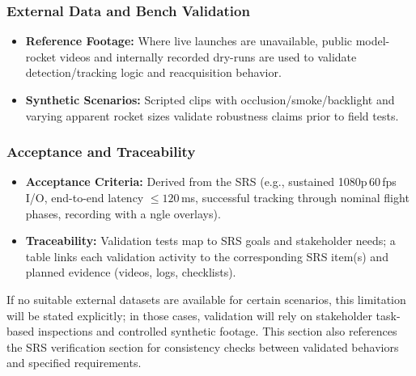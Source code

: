 \documentclass[12pt, titlepage]{article}
\begin{document}
\subsubsection*{External Data and Bench Validation}
\begin{itemize}
  \item \textbf{Reference Footage:} Where live launches are unavailable,
        public model-rocket videos and internally recorded dry-runs are used
        to validate detection/tracking logic and reacquisition behavior.
  \item \textbf{Synthetic Scenarios:} Scripted clips with
        occlusion/smoke/backlight and varying apparent rocket sizes validate
        robustness claims prior to field tests.
\end{itemize}

\subsubsection*{Acceptance and Traceability}
\begin{itemize}
  \item \textbf{Acceptance Criteria:} Derived from the SRS (e.g.,
        sustained 1080p\,60\,fps I/O, end-to-end latency $\leq 120$\,ms,
        successful tracking through nominal flight phases, recording with a
        ngle overlays).
  \item \textbf{Traceability:} Validation tests map to SRS goals and
        stakeholder needs; a table links each validation activity to the
        corresponding SRS item(s) and planned evidence (videos, logs, checklists).
\end{itemize}

\noindent
If no suitable external datasets are available for certain scenarios,
this limitation will be stated explicitly; in those cases, validation
will rely on stakeholder task-based inspections and controlled synthetic
footage. This section also references the SRS verification section for
consistency checks between validated behaviors and specified requirements.



\end{document}
